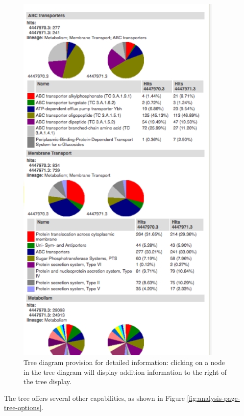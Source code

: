 \documentclass[12pt,fullpage]{report}
\begin{document}
\begin{figure}
\begin{center}
\includegraphics[width=4in]{Images/analysis-page-tree-additional-bar-charts.png}
\end{center}
\caption{
Tree diagram provision for detailed information: 
clicking on a node in the tree diagram will display addition information to the right of the tree display.
}
\label{fig:analysis-page-tree-additional-bar-charts}
\end{figure}

The tree offers several other capabilities, as shown in Figure \ref{fig:analysis-page-tree-options}.
\end{document}
